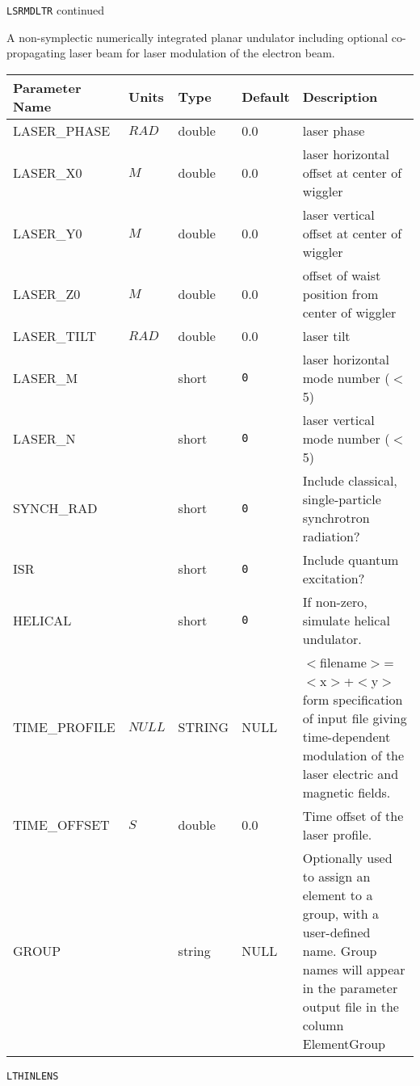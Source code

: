\newpage
\begin{center}{\Large\verb|LSRMDLTR| continued}\end{center}
A non-symplectic numerically integrated planar undulator including optional co-propagating laser beam for laser modulation of the electron beam.
\\
\begin{tabular}{|l|l|l|l|p{\descwidth}|} \hline
Parameter Name & Units & Type & Default & Description \\ \hline 
LASER\_PHASE & $RAD$ & double &  0.0 & laser phase  \\ \hline 
LASER\_X0 & $M$ & double &  0.0 & laser horizontal offset at center of wiggler  \\ \hline 
LASER\_Y0 & $M$ & double &  0.0 & laser vertical offset at center of wiggler  \\ \hline 
LASER\_Z0 & $M$ & double &  0.0 & offset of waist position from center of wiggler  \\ \hline 
LASER\_TILT & $RAD$ & double &  0.0 & laser tilt  \\ \hline 
LASER\_M &  & short &  \verb|0| & laser horizontal mode number ($<$5)  \\ \hline 
LASER\_N &  & short &  \verb|0| & laser vertical mode number ($<$5)  \\ \hline 
SYNCH\_RAD &  & short &  \verb|0| & Include classical, single-particle synchrotron radiation?  \\ \hline 
ISR &  & short &  \verb|0| & Include quantum excitation?  \\ \hline 
HELICAL &  & short &  \verb|0| & If non-zero, simulate helical undulator.  \\ \hline 
TIME\_PROFILE & $NULL$ & STRING &   NULL            & $<$filename$>$=$<$x$>$+$<$y$>$ form specification of input file giving time-dependent modulation of the laser electric and magnetic fields.  \\ \hline 
TIME\_OFFSET & $S$ & double &  0.0 & Time offset of the laser profile.  \\ \hline 
GROUP &  & string & NULL & Optionally used to assign an element to a group, with a user-defined name.  Group names will appear in the parameter output file in the column ElementGroup  \\ \hline 
\end{tabular}

\vspace*{0.5in}

\vspace*{0.5in}

\newpage
\begin{center}{\Large\verb|LTHINLENS|}\end{center}
